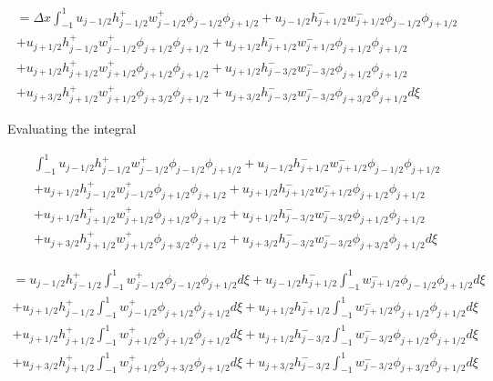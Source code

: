 \documentclass[12pt]{article}
\begin{document}
\begin{multline}
= \Delta x \int_{-1}^{1} u_{j- 1/2}h^+_{j- 1/2}w^+_{j - 1/2}\phi_{j - 1/2}\phi_{j+1/2} + u_{j- 1/2}h^-_{j+ 1/2}w^-_{j + 1/2}\phi_{j - 1/2}\phi_{j+1/2} \\
+  u_{j+1/2}h^+_{j- 1/2}w^+_{j - 1/2}\phi_{j+1/2}\phi_{j+1/2}  + u_{j+1/2}h^-_{j+ 1/2}w^-_{j + 1/2}\phi_{j+1/2}\phi_{j+1/2}\\ + u_{j+1/2} h^+_{j+ 1/2}w^+_{j + 1/2}\phi_{j+1/2}\phi_{j+1/2}  + u_{j+1/2} h^-_{j- 3/2}w^-_{j - 3/2}\phi_{j+1/2}\phi_{j+1/2} \\
+u_{j+ 3/2}h^+_{j+ 1/2}w^+_{j + 1/2}\phi_{j+ 3/2}\phi_{j+1/2} + u_{j+ 3/2}h^-_{j- 3/2}w^-_{j - 3/2}\phi_{j+ 3/2}\phi_{j+1/2} d\xi
\end{multline}

Evaluating the integral

\begin{multline}
\int_{-1}^{1} u_{j- 1/2}h^+_{j- 1/2}w^+_{j - 1/2}\phi_{j - 1/2}\phi_{j+1/2} + u_{j- 1/2}h^-_{j+ 1/2}w^-_{j + 1/2}\phi_{j - 1/2}\phi_{j+1/2} \\
+  u_{j+1/2}h^+_{j- 1/2}w^+_{j - 1/2}\phi_{j+1/2}\phi_{j+1/2}  + u_{j+1/2}h^-_{j+ 1/2}w^-_{j + 1/2}\phi_{j+1/2}\phi_{j+1/2}\\ + u_{j+1/2} h^+_{j+ 1/2}w^+_{j + 1/2}\phi_{j+1/2}\phi_{j+1/2}  + u_{j+1/2} h^-_{j- 3/2}w^-_{j - 3/2}\phi_{j+1/2}\phi_{j+1/2} \\
+u_{j+ 3/2}h^+_{j+ 1/2}w^+_{j + 1/2}\phi_{j+ 3/2}\phi_{j+1/2} + u_{j+ 3/2}h^-_{j- 3/2}w^-_{j - 3/2}\phi_{j+ 3/2}\phi_{j+1/2} d\xi
\end{multline}


\begin{multline}
=u_{j- 1/2}h^+_{j- 1/2}\int_{-1}^{1} w^+_{j - 1/2}\phi_{j - 1/2}\phi_{j+1/2}d\xi  + u_{j- 1/2}h^-_{j+ 1/2}\int_{-1}^{1}w^-_{j + 1/2}\phi_{j - 1/2}\phi_{j+1/2} d\xi\\
+  u_{j+1/2}h^+_{j- 1/2}\int_{-1}^{1} w^+_{j - 1/2}\phi_{j+1/2}\phi_{j+1/2} d\xi  + u_{j+1/2}h^-_{j+ 1/2}\int_{-1}^{1} w^-_{j + 1/2}\phi_{j+1/2}\phi_{j+1/2} d\xi \\ + u_{j+1/2} h^+_{j+ 1/2}\int_{-1}^{1} w^+_{j + 1/2}\phi_{j+1/2}\phi_{j+1/2} d\xi   + u_{j+1/2} h^-_{j- 3/2}\int_{-1}^{1} w^-_{j - 3/2}\phi_{j+1/2}\phi_{j+1/2} d\xi \\
+u_{j+ 3/2}h^+_{j+ 1/2}\int_{-1}^{1} w^+_{j + 1/2}\phi_{j+ 3/2}\phi_{j+1/2} d\xi + u_{j+ 3/2}h^-_{j- 3/2} \int_{-1}^{1} w^-_{j - 3/2}\phi_{j+ 3/2}\phi_{j+1/2} d\xi
\end{multline}
\end{document}
